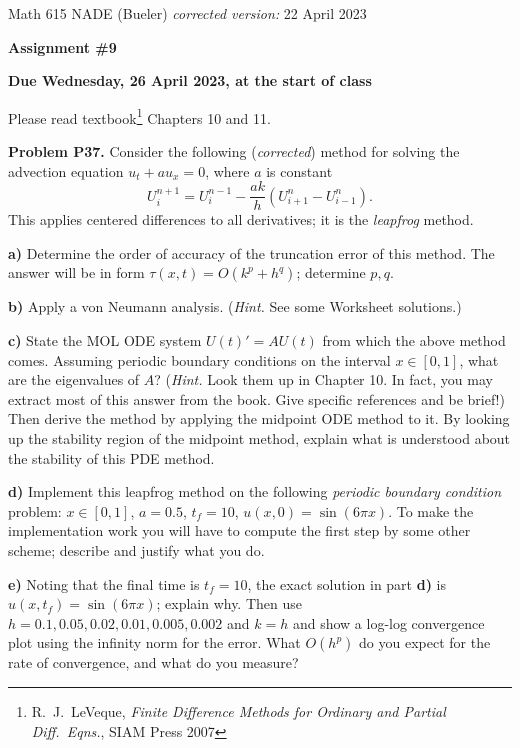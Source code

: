 \documentclass[12pt]{amsart}
\newcommand{\prob}[1]{\bigskip\noindent\textbf{#1}\quad }
\newcommand{\epart}[1]{\medskip\noindent\textbf{#1)}\quad }
\begin{document}
\scriptsize \noindent Math 615 NADE (Bueler) \hfill \emph{corrected version:} 22 April 2023
\normalsize

\medskip\bigskip

\Large\centerline{\textbf{Assignment \#9}}
\large
\bigskip

\centerline{\textbf{Due Wednesday, 26 April 2023, at the start of class}}
\bigskip
\normalsize

\thispagestyle{empty}

\bigskip
Please read textbook\footnote{R.~J.~LeVeque, \emph{Finite Difference Methods for Ordinary and Partial Diff.~Eqns.}, SIAM Press 2007} Chapters 10 and 11.


\medskip
\prob{Problem P37.}  Consider the following (\emph{corrected}) method for solving the advection equation
$u_t + a u_x = 0$, where $a$ is constant
    $$U_i^{n+1} = U_i^{n-1} - \frac{ak}{h}(U_{i+1}^n - U_{i-1}^n).$$
This applies centered differences to all derivatives; it is the \emph{leapfrog} method.

\epart{a} Determine the order of accuracy of the truncation error of this method.  The answer will be in form $\tau(x,t) = O(k^p + h^q)$; determine $p,q$.

\epart{b} Apply a von Neumann analysis.  (\emph{Hint.}  See some Worksheet solutions.)

\epart{c} State the MOL ODE system $U(t)' = A U(t)$ from which the above method comes.  Assuming periodic boundary conditions on the interval $x\in[0,1]$, what are the eigenvalues of $A$?  (\emph{Hint.}  Look them up in Chapter 10.  In fact, you may extract most of this answer from the book.  Give specific references and be brief!)  Then derive the method by applying the midpoint ODE method to it.  By looking up the stability region of the midpoint method, explain what is understood about the stability of this PDE method.

\epart{d} Implement this leapfrog method on the following \emph{periodic boundary condition} problem:  $x\in[0,1]$, $a = 0.5$, $t_f = 10$, $u(x,0)=\sin(6\pi x)$.  To make the implementation work you will have to compute the first step by some other scheme; describe and justify what you do.

\epart{e} Noting that the final time is $t_f=10$, the exact solution in part \textbf{d)} is $u(x,t_f) = \sin(6\pi x)$; explain why.  Then use $h=0.1,0.05,0.02,0.01,0.005,0.002$ and $k=h$ and show a log-log convergence plot using the infinity norm for the error.  What $O(h^p)$ do you expect for the rate of convergence, and what do you measure?
\end{document}
